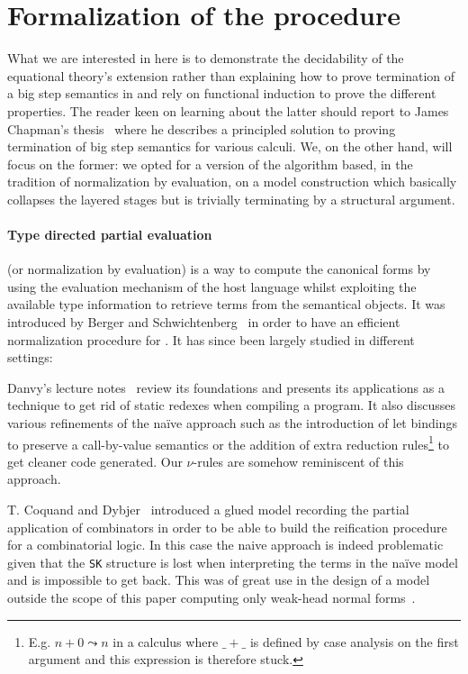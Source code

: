 



\section{Formalization of the procedure}

What we are interested in here is to demonstrate the decidability of the equational
theory's extension rather than explaining how to prove termination of a big step
semantics in \agda{} and rely on functional induction to prove the different
properties. The reader keen on learning about the latter should report to James
Chapman's thesis~\cite{ChapmanPhd} where he describes a principled solution to
proving termination of big step semantics for various calculi. We, on the other
hand, will focus on the former: we opted for a version of the algorithm based, in
the tradition of normalization by evaluation, on a model construction which
basically collapses the layered stages but is trivially terminating by a structural
argument.

\paragraph{Type directed partial evaluation} (or normalization by evaluation) is
a way to compute the canonical forms by using the evaluation mechanism of the host
language whilst exploiting the available type information to retrieve terms from
the semantical objects. It was introduced by Berger and Schwichtenberg~\cite{BerSch91}
in order to have an efficient normalization procedure for \lego{}. It has since been
largely studied in different settings:

Danvy's lecture notes~\cite{TypeDirected} review its foundations and presents its
applications as a technique to get rid of static redexes when compiling a program.
It also discusses various refinements of the naïve approach such as the introduction
of let bindings to preserve a call-by-value semantics or the addition of extra
reduction rules\footnote{E.g. $n + 0 \leadsto n$ in a calculus where $\_+\_$ is
defined by case analysis on the first argument and this expression is therefore
stuck.} to get cleaner code generated. Our $\nu$-rules are somehow reminiscent of
this approach.

T. Coquand and Dybjer~\cite{CoqDyb97} introduced a glued model recording the partial
application of combinators in order to be able to build the reification procedure
for a combinatorial logic. In this case the naive approach is indeed problematic
given that the \texttt{SK} structure is lost when interpreting the terms in the
naïve model and is impossible to get back. This was of great use in the design of
a model outside the scope of this paper computing only weak-head normal forms~\cite{ForgeAcquire}.

